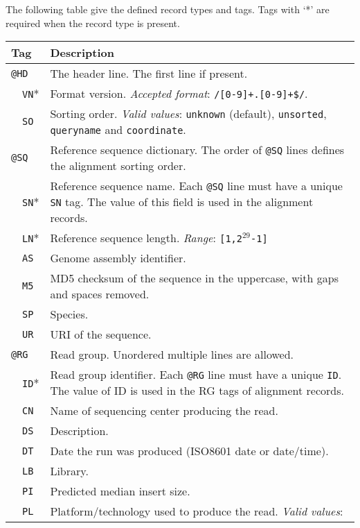 \documentclass[10pt]{article}
\begin{document}
The following table give the defined record types and tags. Tags with
`*' are required when the record type is present.
\begin{center}
\small
\begin{tabular}{|l|l|p{13.5cm}|}
  \hline
  \multicolumn{2}{|l|}{\bf Tag} & {\bf Description} \\
  \hline
  \multicolumn{2}{|l}{\tt @HD} & The header line. The first line if present. \\\cline{2-3}
  & {\tt VN}* & Format version. \emph{Accepted format}: {\tt /\char94[0-9]+\char92.[0-9]+\$/}.\\\cline{2-3}
  & {\tt SO} & Sorting order. \emph{Valid values}: {\tt unknown} (default), {\tt unsorted}, {\tt queryname} and {\tt coordinate}. \\\hline
  \multicolumn{2}{|l}{\tt @SQ} & Reference sequence dictionary. The order of {\tt @SQ} lines defines the alignment sorting order.\\\cline{2-3}
  & {\tt SN}* & Reference sequence name. Each {\tt @SQ} line must have a unique {\tt SN} tag. The value of this
  field is used in the
  alignment records. \\\cline{2-3}
  & {\tt LN}* & Reference sequence length. \emph{Range}: {\tt [1,2$^{29}$-1]}\\\cline{2-3}
  & {\tt AS} & Genome assembly identifier. \\\cline{2-3}
  & {\tt M5} & MD5 checksum of the sequence in the uppercase, with gaps and spaces removed.\\\cline{2-3}
  & {\tt SP} & Species.\\\cline{2-3}
  & {\tt UR} & URI of the sequence.\\\hline
  \multicolumn{2}{|l}{\tt @RG} & Read group. Unordered multiple lines are allowed.\\\cline{2-3}
  & {\tt ID}* & Read group identifier. Each {\tt @RG} line must have a unique {\tt ID}. The value of ID
  is used in the RG tags of alignment records. \\\cline{2-3}
  & {\tt CN} & Name of sequencing center producing the read.\\\cline{2-3}
  & {\tt DS} & Description.\\\cline{2-3}
  & {\tt DT} & Date the run was produced (ISO8601 date or date/time).\\\cline{2-3}
  & {\tt LB} & Library.\\\cline{2-3}
  & {\tt PI} & Predicted median insert size.\\\cline{2-3}
  & {\tt PL} & Platform/technology used to produce the read. \emph{Valid values}:

\end{tabular}
\end{center}
\end{document}
